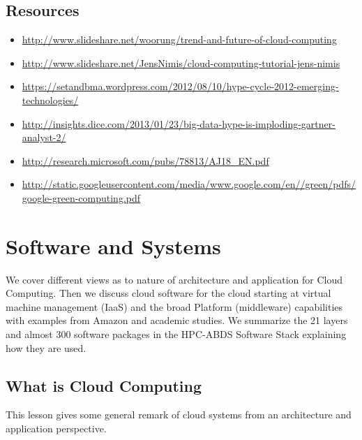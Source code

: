 
\subsection{Resources}

\begin{itemize}
\item
  \url{http://www.slideshare.net/woorung/trend-and-future-of-cloud-computing}
\item
  \url{http://www.slideshare.net/JensNimis/cloud-computing-tutorial-jens-nimis}
\item
  \url{https://setandbma.wordpress.com/2012/08/10/hype-cycle-2012-emerging-technologies/}
\item
  \url{http://insights.dice.com/2013/01/23/big-data-hype-is-imploding-gartner-analyst-2/}
\item
  \url{http://research.microsoft.com/pubs/78813/AJ18_EN.pdf}
\item
  \url{http://static.googleusercontent.com/media/www.google.com/en//green/pdfs/google-green-computing.pdf}
\end{itemize}

\section{Software and Systems}

We cover different views as to nature of architecture and application
for Cloud Computing. Then we discuss cloud software for the cloud
starting at virtual machine management (IaaS) and the broad Platform
(middleware) capabilities with examples from Amazon and academic
studies. We summarize the 21 layers and almost 300 software packages in
the HPC-ABDS Software Stack explaining how they are used.



\subsection{What is Cloud Computing}\label{what-is-cloud-computing}

This lesson gives some general remark of cloud systems from an
architecture and application perspective.


